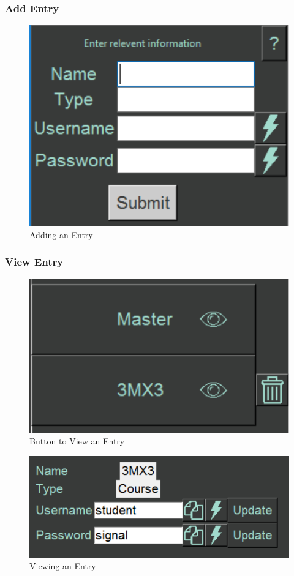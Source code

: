\documentclass[12pt, titlepage]{article}
\begin{document}
\subsubsection{Add Entry} \label{AddEnt}

\begin{figure}[h]
	\includegraphics[scale=0.3]{images/AddEntry.png}
	\caption{Adding an Entry}
	\label{fig:AdEnt}
\end{figure}

\subsubsection{View Entry} \label{ViewEnt}

\begin{figure}[h]
	\includegraphics[scale=0.3]{images/ViewEntry.png}
	\caption{Button to View an Entry}
	\label{fig:VieEnt1}
\end{figure}

\begin{figure}[h]
	\includegraphics[scale=0.3]{images/UpdateEntry.png}
	\caption{Viewing an Entry}
	\label{fig:VieEnt2}
\end{figure}
\end{document}
